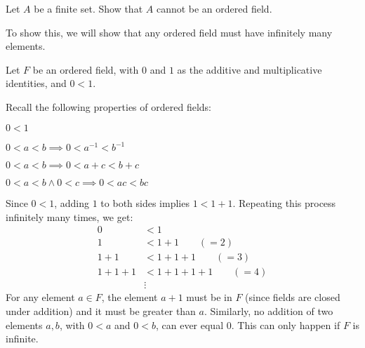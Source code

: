 \begin{problem}
  Let $A$ be a finite set.
  Show that $A$ cannot be an ordered field.
\end{problem}
\begin{answer}
  To show this, we will show that any ordered field must have infinitely many elements.

  \step
  Let $F$ be an ordered field, with $0$ and $1$ as the additive
  and multiplicative identities, and $0 < 1$.

  Recall the following properties of ordered fields:
  \begin{enumarabic}
    \item $0 < 1$
    \item $0 < a < b \implies 0 < a^{-1} < b^{-1}$
    \item $0 < a < b \implies 0 < a + c < b + c$
    \item $0 < a < b \land 0 < c \implies 0 < ac < bc$
  \end{enumarabic}

  \step
  Since $0 < 1$, adding $1$ to both sides implies $1 < 1+1$.
  Repeating this process infinitely many times, we get:
  \begin{align*}
    0 &< 1 \\
    1 &< 1 + 1 \qquad (= 2) \\
    1 + 1 &< 1 + 1 + 1 \qquad (= 3) \\
    1 + 1 + 1 &< 1 + 1 + 1 + 1 \qquad (= 4) \\
    &\vdots
  \end{align*}  
  For any element $a \in F$, the element $a + 1$ must be in $F$ (since fields are closed under addition)
  and it must be greater than $a$. Similarly, no addition of two elements
  $a, b$, with $0 < a$ and $0 < b$, can ever equal $0$.
  This can only happen if $F$ is infinite.
  
\end{answer}
